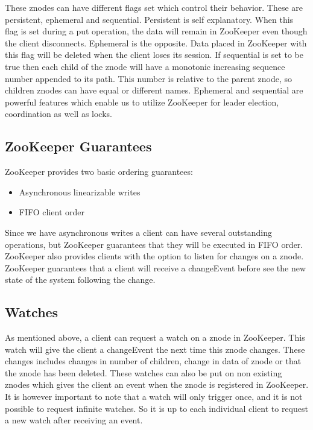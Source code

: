 These znodes can have different flags set which control their behavior. These are persistent, ephemeral and sequential. Persistent is self explanatory. When this flag is set during a put operation, the data will remain in ZooKeeper even though the client disconnects. Ephemeral is the opposite. Data placed in ZooKeeper with this flag will be deleted when the client loses its session. If sequential is set to be true then each child of the znode will have a monotonic increasing sequence number appended to its path. This number is relative to the parent znode, so children znodes can have equal or different names. Ephemeral and sequential are powerful features which enable us to utilize ZooKeeper for leader election, coordination as well as locks. 

\subsection{ZooKeeper Guarantees}
ZooKeeper provides two basic ordering guarantees:

\begin{itemize}
	\item Asynchronous linearizable writes
 	\item FIFO client order
\end{itemize}

Since we have asynchronous writes a client can have several outstanding operations, but ZooKeeper guarantees that they will be executed in FIFO order. ZooKeeper also provides clients with the option to listen for changes on a znode. ZooKeeper guarantees that a client will receive a changeEvent before see the new state of the system following the change. 

\subsection{Watches}
As mentioned above, a client can request a watch on a znode in ZooKeeper. This watch will give the client a changeEvent the next time this znode changes. These changes includes changes in number of children, change in data of znode or that the znode has been deleted. These watches can also be put on non existing znodes which gives the client an event when the znode is registered in ZooKeeper. It is however important to note that a watch will only trigger once, and it is not possible to request infinite watches. So it is up to each individual client to request a new watch after receiving an event.

